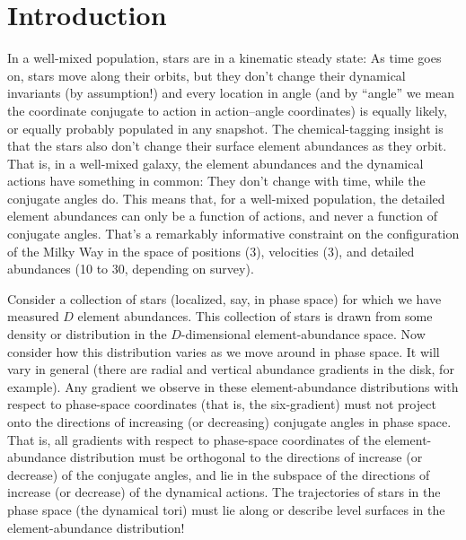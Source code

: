 \documentclass[modern]{aastex63}
\begin{document}

\section*{}\clearpage

\section{Introduction}

In a well-mixed population, stars are in a kinematic steady state:
As time goes on, stars move along their orbits, but they don't change their dynamical
invariants (by assumption!) and every location in angle (and by ``angle'' we mean the
coordinate conjugate to action in action--angle coordinates) is equally likely, or
equally probably populated in any snapshot.
The chemical-tagging insight is that the stars also don't change their surface element
abundances as they orbit.
That is, in a well-mixed galaxy, the element abundances and the dynamical actions have
something in common:
They don't change with time, while the conjugate angles do.
This means that, for a well-mixed population, the detailed element abundances can only
be a function of actions, and never a function of conjugate angles.
That's a remarkably informative constraint on the configuration of the Milky Way in
the space of positions (3), velocities (3), and detailed abundances (10 to 30, depending
on survey).

Consider a collection of stars (localized, say, in phase space) for which we have
measured $D$ element abundances.
This collection of stars is drawn from some density or distribution in
the $D$-dimensional element-abundance space.
Now consider how this distribution varies as we move around in phase space.
It will vary in general (there are radial and vertical abundance gradients in the
disk, for example).
Any gradient we observe in these element-abundance distributions with respect to
phase-space coordinates (that is, the six-gradient) must not project
onto the directions of increasing (or decreasing) conjugate angles in phase space.
That is, all gradients with respect to phase-space coordinates
of the element-abundance distribution must be orthogonal to the
directions of increase (or decrease) of the conjugate angles, and lie in the subspace
of the directions of increase (or decrease) of the dynamical actions.
The trajectories of stars in the phase space (the dynamical tori) must lie along or
describe level surfaces in the element-abundance distribution!
\end{document}
